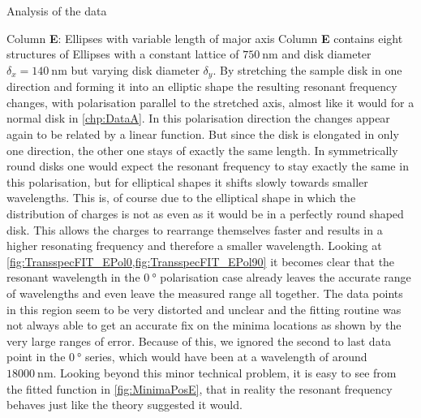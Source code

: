 \documentclass[pdftex, a4paper,11pt, twoside, UKenglish]{report}
\begin{document}
\begin{chapter}{Analysis of the data}
    \newpage
    \begin{section}{Column \textbf{E}: Ellipses with variable length of
        major axis}
      \label{chp:DataE}
      Column \textbf{E} contains eight structures of Ellipses with a constant
      lattice of $\SI{750}{\nano\meter}$ and disk diameter
      $\delta_{x} = \SI{140}{\nano\meter}$ but varying disk diameter
      $\delta_{y}$. \newline
      By stretching the sample disk in one direction and forming it into an
      elliptic shape the resulting resonant frequency changes, with polarisation
      parallel to the stretched axis, almost like it would for a normal disk
      in \cref{chp:DataA}. In this polarisation direction the changes appear
      again to be related by a linear function. But since the disk is elongated
      in only one direction, the other one stays of exactly the same length.
      In symmetrically round disks one would expect the resonant frequency to
      stay exactly the same in this polarisation, but for elliptical shapes it
      shifts slowly towards smaller wavelengths. This is, of course due to the
      elliptical shape in which the distribution of charges is not as even as it
      would be in a perfectly round shaped disk. This allows the charges to
      rearrange themselves faster and results in a higher resonating frequency
      and therefore a smaller wavelength.\newline
      Looking at \cref{fig:TransspecFIT_EPol0,fig:TransspecFIT_EPol90} it
      becomes clear that the resonant wavelength in the $\SI{0}{\degree}$
      polarisation case already leaves the accurate range of wavelengths and
      even leave the measured range all together.
      The data points in this region seem to be very distorted and unclear and
      the fitting routine was not always able to get an accurate fix on the
      minima locations as shown by the very large ranges of error. Because of
      this, we ignored the second to last data point in the $\SI{0}{\degree}$
      series, which would have been at a wavelength of around
      $\SI{18000}{\nano\meter}$. Looking beyond this minor technical problem,
      it is easy to see from the fitted function in \cref{fig:MinimaPosE},
      that in reality the resonant frequency behaves just like the theory
      suggested it would.
      

\end{section}
\end{chapter}
\end{document}
